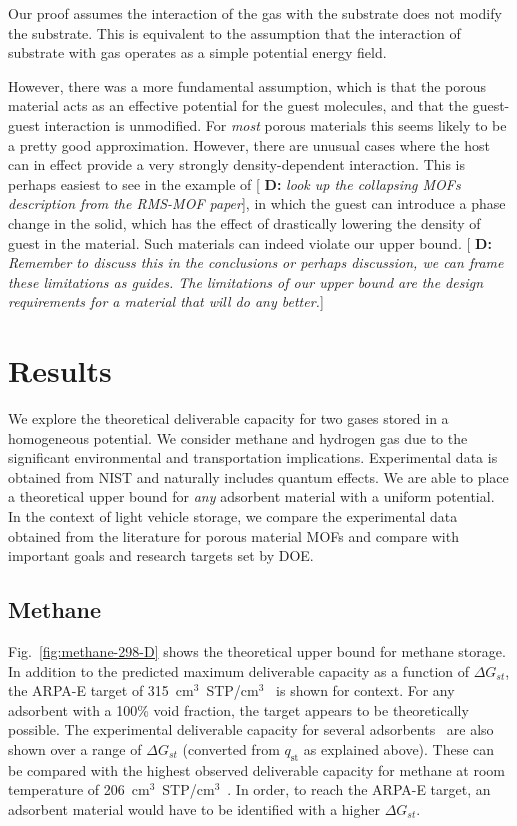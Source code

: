 \documentclass{nature}
\newcommand{\blue}[1]{{\bf \color{blue} #1}}
\newcommand{\davidsays}[1]{{\color{red} [\blue{D:} \emph{#1}]}}
\begin{document}
\begin{limitation}\label{limit:field}
Our proof assumes the interaction of the gas with the substrate does not modify the substrate.  This is equivalent to the assumption that the interaction of substrate with gas operates as a simple potential energy field.
\end{limitation}

However, there was a more fundamental assumption, which is that the porous material acts as an effective potential for the guest molecules, and that the guest-guest interaction is unmodified.  For \emph{most} porous materials this seems likely to be a pretty good approximation.  However, there are unusual cases where the host can in effect provide a very strongly density-dependent interaction.  This is perhaps easiest to see in the example of \davidsays{look up the collapsing MOFs description from the RMS-MOF paper}, in which the guest can introduce a phase change in the solid, which has the effect of drastically lowering the density of guest in the material.  Such materials can indeed violate our upper bound. \davidsays{Remember to discuss this in the conclusions or perhaps discussion, we can frame these limitations as guides.  The limitations of our upper bound are the design requirements for a material that will do any better.}


\section{Results}
We explore the theoretical deliverable capacity for two gases stored in a homogeneous potential. We consider methane and hydrogen gas due to the significant environmental and transportation implications. Experimental data is obtained from NIST and naturally includes quantum effects. We are able to place a theoretical upper bound for \emph{any} adsorbent material with a uniform potential. In the context of light vehicle storage, we compare the experimental data obtained from the literature for porous material MOFs and compare with important goals and research targets set by DOE.

\subsection{Methane}
Fig.~\ref{fig:methane-298-D} shows the theoretical upper bound for methane storage. In addition to the predicted maximum deliverable capacity as a function of $\Delta G_{st}$, the ARPA-E target of 315~cm$^3$~STP/cm$^3$~\cite{arpaemove} is shown for context.  For any adsorbent with a 100\% void fraction, the target appears to be theoretically possible. The experimental deliverable capacity for several adsorbents~\cite{mason2014evaluating} are also shown over a range of $\Delta G_{st}$ (converted from $q_\text{st}$ as explained above). These can be compared with the highest observed deliverable capacity for methane at room temperature of 206~cm$^3$~STP/cm$^3$~\cite{gomez2014exploring}. In order, to
reach the ARPA-E target, an adsorbent material would have to be identified with a higher $\Delta G_{st}$.
\end{document}
